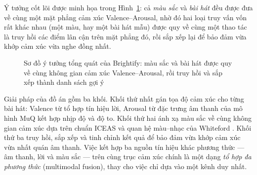 \documentclass[../DoAn.tex]{subfiles}
\begin{document}
Ý tưởng cốt lõi được minh họa trong Hình~\ref{fig:overview}: cả \textit{màu sắc} và \textit{bài hát} đều được đưa về cùng một mặt phẳng cảm xúc Valence--Arousal, nhờ đó hai loại truy vấn vốn rất khác nhau (một màu, hay một bài hát mẫu) được quy về cùng một thao tác là truy hồi các điểm lân cận trên mặt phẳng đó, rồi sắp xếp lại để bảo đảm vừa khớp cảm xúc vừa nghe đồng nhất.

\begin{figure}[tbp]
\centering
{}
\caption{Sơ đồ ý tưởng tổng quát của Brightify: màu sắc và bài hát được quy về cùng không gian cảm xúc Valence--Arousal, rồi truy hồi và sắp xếp thành danh sách gợi ý}
\label{fig:overview}
\end{figure}

Giải pháp của đồ án gồm ba khối. Khối thứ nhất gán tọa độ cảm xúc cho từng bài hát: Valence từ tổ hợp tín hiệu lời, Arousal từ đặc trưng âm thanh của mô hình MuQ \cite{zhu2025muq} kết hợp nhịp độ và độ to. Khối thứ hai ánh xạ màu sắc về cùng không gian cảm xúc dựa trên chuẩn ICEAS \cite{jonauskaite2020universal} và quan hệ màu--nhạc của Whiteford \cite{whiteford2018color}. Khối thứ ba truy hồi, sắp xếp và tinh chỉnh kết quả để bảo đảm vừa khớp cảm xúc vừa nhất quán âm thanh. Việc kết hợp ba nguồn tín hiệu khác phương thức --- âm thanh, lời và màu sắc --- trên cùng trục cảm xúc chính là một dạng \textit{tổ hợp đa phương thức} (multimodal fusion), thay cho việc chỉ dựa vào một kênh duy nhất.
\end{document}
